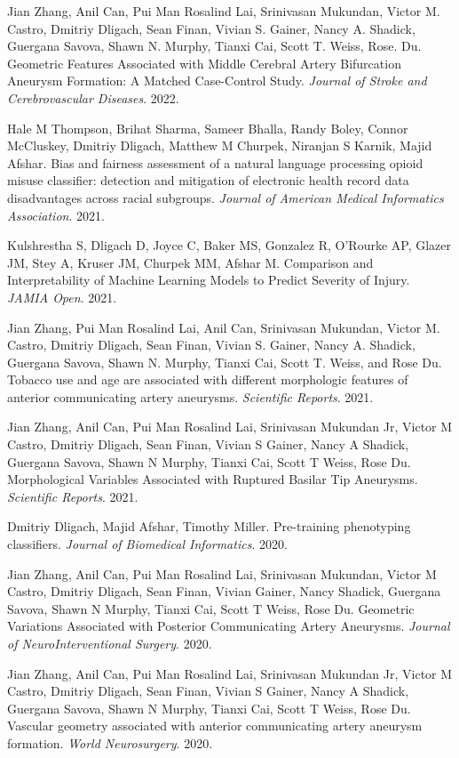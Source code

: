 \documentclass[letterpaper]{article}
\renewenvironment{itemize}{
  \begin{list}{}{
    \setlength{\leftmargin}{1.5em}
  }
}{
  \end{list}
}
\begin{document}
\begin{itemize}
\item Jian Zhang, Anil Can, Pui Man Rosalind Lai, Srinivasan Mukundan, Victor M. Castro, Dmitriy Dligach, Sean Finan, Vivian S. Gainer, Nancy A. Shadick, Guergana Savova, Shawn N. Murphy, Tianxi Cai, Scott T. Weiss, Rose. Du. Geometric Features Associated with Middle Cerebral Artery Bifurcation Aneurysm Formation: A Matched Case-Control Study. \emph{Journal of Stroke and Cerebrovascular Diseases}. 2022.
\item Hale M Thompson, Brihat Sharma, Sameer Bhalla, Randy Boley, Connor McCluskey, Dmitriy Dligach, Matthew M Churpek, Niranjan S Karnik, Majid Afshar. Bias and fairness assessment of a natural language processing opioid misuse classifier: detection and mitigation of electronic health record data disadvantages across racial subgroups. \emph{Journal of American Medical Informatics Association}. 2021.
\item Kulshrestha S, Dligach D, Joyce C, Baker MS, Gonzalez R, O’Rourke AP, Glazer JM, Stey A, Kruser JM, Churpek MM, Afshar M. Comparison and Interpretability of Machine Learning Models to Predict Severity of Injury. \emph{JAMIA Open}. 2021.
\item Jian Zhang, Pui Man Rosalind Lai, Anil Can, Srinivasan Mukundan, Victor M. Castro, Dmitriy Dligach, Sean Finan, Vivian S. Gainer, Nancy A. Shadick, Guergana Savova, Shawn N. Murphy, Tianxi Cai, Scott T. Weiss, and Rose Du. Tobacco use and age are associated with different morphologic features of anterior communicating artery aneurysms. \emph{Scientific Reports}. 2021.
\item Jian Zhang, Anil Can, Pui Man Rosalind Lai, Srinivasan Mukundan Jr, Victor M Castro, Dmitriy Dligach, Sean Finan, Vivian S Gainer, Nancy A Shadick, Guergana Savova, Shawn N Murphy, Tianxi Cai, Scott T Weiss, Rose Du. Morphological Variables Associated with Ruptured Basilar Tip Aneurysms. \emph{Scientific Reports}. 2021.
\item Dmitriy Dligach, Majid Afshar, Timothy Miller. Pre-training phenotyping classifiers. \emph{Journal of Biomedical Informatics}. 2020.
\item Jian Zhang, Anil Can, Pui Man Rosalind Lai, Srinivasan Mukundan, Victor M Castro, Dmitriy Dligach, Sean Finan, Vivian Gainer, Nancy Shadick, Guergana Savova, Shawn N Murphy, Tianxi Cai, Scott T Weiss, Rose Du. Geometric Variations Associated with Posterior Communicating Artery Aneurysms. \emph{Journal of NeuroInterventional Surgery}. 2020.
\item Jian Zhang, Anil Can, Pui Man Rosalind Lai, Srinivasan Mukundan Jr, Victor M Castro, Dmitriy Dligach, Sean Finan, Vivian S Gainer, Nancy A Shadick, Guergana Savova, Shawn N Murphy, Tianxi Cai, Scott T Weiss, Rose Du. Vascular geometry associated with anterior communicating artery aneurysm formation. \emph{World Neurosurgery}. 2020.

\end{itemize}
\end{document}
